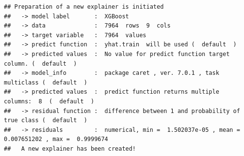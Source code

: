 \documentclass[
]{article}
\newenvironment{Shaded}{\begin{snugshade}}{\end{snugshade}}
\newcommand{\AttributeTok}[1]{\textcolor[rgb]{0.13,0.29,0.53}{#1}}
\newcommand{\FunctionTok}[1]{\textcolor[rgb]{0.13,0.29,0.53}{\textbf{#1}}}
\newcommand{\NormalTok}[1]{#1}
\newcommand{\OtherTok}[1]{\textcolor[rgb]{0.56,0.35,0.01}{#1}}
\newcommand{\SpecialCharTok}[1]{\textcolor[rgb]{0.81,0.36,0.00}{\textbf{#1}}}
\newcommand{\StringTok}[1]{\textcolor[rgb]{0.31,0.60,0.02}{#1}}
\begin{document}
\begin{Shaded}
\end{Shaded}

\begin{verbatim}
## Preparation of a new explainer is initiated
##   -> model label       :  XGBoost 
##   -> data              :  7964  rows  9  cols 
##   -> target variable   :  7964  values 
##   -> predict function  :  yhat.train  will be used (  default  )
##   -> predicted values  :  No value for predict function target column. (  default  )
##   -> model_info        :  package caret , ver. 7.0.1 , task multiclass (  default  ) 
##   -> predicted values  :  predict function returns multiple columns:  8  (  default  ) 
##   -> residual function :  difference between 1 and probability of true class (  default  )
##   -> residuals         :  numerical, min =  1.502037e-05 , mean =  0.007651202 , max =  0.9999674  
##   A new explainer has been created!
\end{verbatim}
\end{document}

